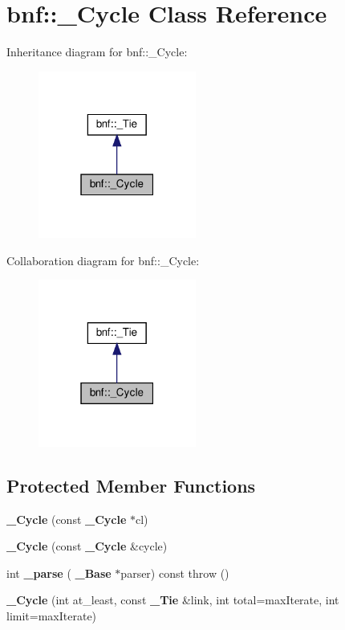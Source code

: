 \section{bnf\+:\+:\+\_\+\+Cycle Class Reference}
\label{classbnf_1_1___cycle}


Inheritance diagram for bnf\+:\+:\+\_\+\+Cycle\+:
\nopagebreak
\begin{figure}[H]
\begin{center}
\leavevmode
\includegraphics[width=147pt]{classbnf_1_1___cycle__inherit__graph}
\end{center}
\end{figure}


Collaboration diagram for bnf\+:\+:\+\_\+\+Cycle\+:
\nopagebreak
\begin{figure}[H]
\begin{center}
\leavevmode
\includegraphics[width=147pt]{classbnf_1_1___cycle__coll__graph}
\end{center}
\end{figure}
\subsection*{Protected Member Functions}
\begin{DoxyCompactItemize}
\item 
\mbox{\label{classbnf_1_1___cycle_a4c0920f51b63a6e78f5c2b117bf2c81b}} 
{\bfseries \+\_\+\+Cycle} (const \textbf{ \+\_\+\+Cycle} $\ast$cl)
\item 
\mbox{\label{classbnf_1_1___cycle_acf425c301789e1e7f7dda3685a869b96}} 
{\bfseries \+\_\+\+Cycle} (const \textbf{ \+\_\+\+Cycle} \&cycle)
\item 
\mbox{\label{classbnf_1_1___cycle_adb2e2eaec3ddc1bce09855229cb5f2ca}} 
int {\bfseries \+\_\+parse} (\textbf{ \+\_\+\+Base} $\ast$parser) const  throw ()
\item 
\mbox{\label{classbnf_1_1___cycle_a2d6de9d3b4c142c1396d34ca2b0e8ae3}} 
{\bfseries \+\_\+\+Cycle} (int at\+\_\+least, const \textbf{ \+\_\+\+Tie} \&link, int total=max\+Iterate, int limit=max\+Iterate)
\end{DoxyCompactItemize}
